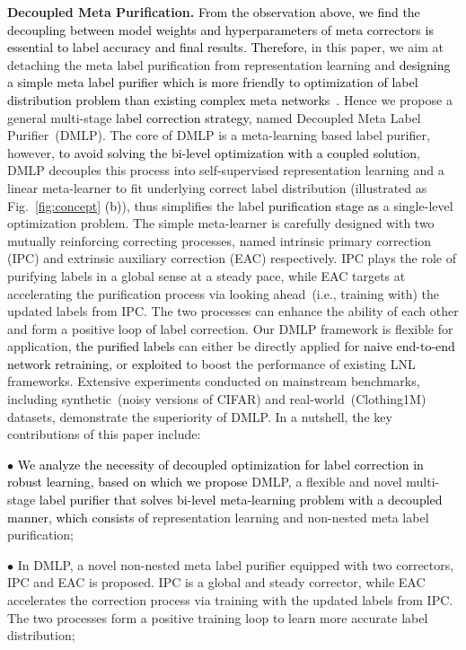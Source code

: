 \documentclass[10pt,twocolumn,letterpaper]{article}
\newcommand{\lyx}[1]{\textcolor{black}{#1}}
\newcommand{\leone}[1]{\textcolor{black}{#1}}
\newcommand{\zbsN}[1]{\textcolor{black}{#1}}
\begin{document}
{\textbf{Decoupled Meta Purification.}} \zbsN{From the observation above, } \lyx{we find the decoupling between model weights and hyperparameters of meta correctors is essential to label accuracy and final results. Therefore, }
in this paper, we {aim at detaching the meta label purification from representation learning and} \lyx{designing a simple meta label purifier which is more friendly to optimization of label distribution problem than existing complex meta networks~\cite{zheng2021meta, AAAI-2021-meta}.} Hence we propose a general multi-stage \lyx{label correction strategy}, named Decoupled Meta Label Purifier~(DMLP). {The core of DMLP is a meta-learning based label purifier, however,} \lyx{to avoid solving the bi-level optimization with a coupled solution}, DMLP decouples {this process into self-supervised} representation learning and {a linear meta-learner to fit underlying correct label distribution (illustrated as Fig.~\ref{fig:concept} \leone{(b)})}, thus simplifies the label \lyx{purification stage as} a single-level optimization problem. {The simple meta-learner is carefully designed with two mutually reinforcing correcting processes, named intrinsic primary correction (IPC) and extrinsic auxiliary correction (EAC) respectively. IPC plays the role of purifying labels in a global sense at a steady pace, while EAC targets at accelerating the purification process via looking ahead~(i.e., training with) the updated labels from IPC. The two processes can enhance the ability of each other and form a positive loop of label correction.}
{Our DMLP framework is flexible for application, \lyx{the purified labels} can either be directly applied for \lyx{naive end-to-end network retraining}, or \lyx{exploited} to boost the performance of existing LNL frameworks.} Extensive experiments conducted on mainstream benchmarks, including synthetic~(noisy versions of CIFAR) and real-world~(Clothing1M) datasets, demonstrate the superiority of {DMLP}. In a nutshell, the key contributions of this paper include:






$\bullet$ \lyx{We analyze the necessity of decoupled optimization for label correction in robust learning, based on which we propose }DMLP, a {flexible and} novel multi-stage \lyx{label purifier that solves bi-level meta-learning problem with a decoupled manner, which consists of} representation learning and {non-nested meta label purification; } 

$\bullet$ In DMLP, a novel non-nested meta label purifier equipped with two correctors, IPC and EAC is proposed. IPC is a global and steady corrector, while EAC accelerates the correction process via training with the updated labels from IPC. The two processes form a positive training loop {to learn more accurate label distribution};
\end{document}
